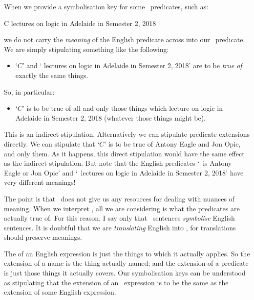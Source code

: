 When we provide a symbolisation key for some \FOL\ predicates, such as:
	\begin{ekey}
		\item[C]  lectures on logic in Adelaide in Semester 2, 2018
	\end{ekey} 
we do not carry the \emph{meaning} of the English predicate across into our \FOL\ predicate. We are simply stipulating something like the following:
	\begin{itemize}
		\item `$C$' and ` lectures on logic in Adelaide in Semester 2, 2018' are to be \emph{true of} exactly the same things. 
	\end{itemize}
So, in particular:
	\begin{itemize}
		\item `$C$' is to be true of all and only those things which lecture on logic in Adelaide in Semester 2, 2018 (whatever those things might be).
	\end{itemize}
This is an indirect stipulation. Alternatively we can stipulate predicate extensions directly. We can stipulate that `$C$' is to be true of Antony Eagle and Jon Opie, and only them. As it happens, this direct stipulation would have the same effect as the indirect stipulation. But note that the English predicates `\blank\ is Antony Eagle or Jon Opie' and `\blank\ lectures on logic in Adelaide in Semester 2, 2018' have very different meanings!

The point is that \FOL\ does not give us any resources for dealing with nuances of meaning. When we interpret \FOL, all we are considering is what the predicates are actually true of. For this reason, I say only that \FOL\ sentences \emph{symbolise} English sentences. It is doubtful that we are \emph{translating} English into \FOL, for translations should preserve meanings.

 The  of an English expression is just the things to which it actually applies. So the extension of a name is the thing actually named; and the extension of a predicate is just those things it actually covers. Our symbolisation keys can be understood as stipulating that the extension of an \FOL\ expression is to be the same as the extension of some English expression. 

